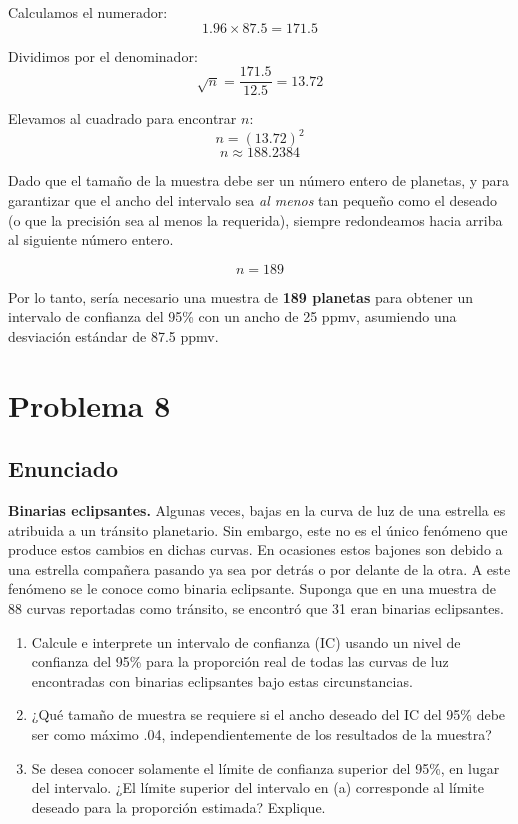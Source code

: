 \documentclass[12pt]{article}
\begin{document}
Calculamos el numerador:
$$ 1.96 \times 87.5 = 171.5 $$

Dividimos por el denominador:
$$ \sqrt{n} = \frac{171.5}{12.5} = 13.72 $$

Elevamos al cuadrado para encontrar $n$:
$$ n = (13.72)^2 $$
$$ n \approx 188.2384 $$

Dado que el tamaño de la muestra debe ser un número entero de planetas, y para garantizar que el ancho del intervalo sea \textit{al menos} tan pequeño como el deseado (o que la precisión sea al menos la requerida), siempre redondeamos hacia arriba al siguiente número entero.

$$ n = 189 $$

Por lo tanto, sería necesario una muestra de \textbf{189 planetas} para obtener un intervalo de confianza del 95\% con un ancho de 25 ppmv, asumiendo una desviación estándar de 87.5 ppmv.



\section{Problema 8}

\subsection{Enunciado}
\textbf{Binarias eclipsantes.} Algunas veces, bajas en la curva de luz de una estrella es atribuida a un tránsito planetario. Sin embargo, este no es el único fenómeno que produce estos cambios en dichas curvas. En ocasiones estos bajones son debido a una estrella compañera pasando ya sea por detrás o por delante de la otra. A este fenómeno se le conoce como binaria eclipsante. Suponga que en una muestra de 88 curvas reportadas como tránsito, se encontró que 31 eran binarias eclipsantes.

\begin{enumerate}
    \item[a)] Calcule e interprete un intervalo de confianza (IC) usando un nivel de confianza del 95\% para la proporción real de todas las curvas de luz encontradas con binarias eclipsantes bajo estas circunstancias.
    \item[b)] ¿Qué tamaño de muestra se requiere si el ancho deseado del IC del 95\% debe ser como máximo .04, independientemente de los resultados de la muestra?
    \item[c)] Se desea conocer solamente el límite de confianza superior del 95\%, en lugar del intervalo. ¿El límite superior del intervalo en (a) corresponde al límite deseado para la proporción estimada? Explique.
\end{enumerate}
\end{document}
